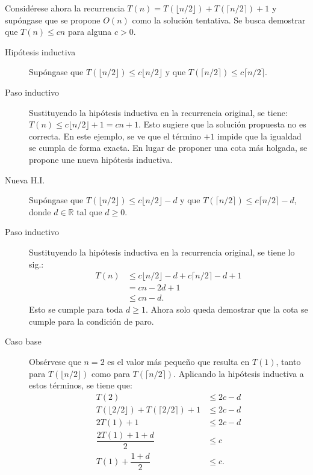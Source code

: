 \newpage
\begin{expl}
    Considérese ahora la recurrencia \(T(n)=T(\lfloor n/2\rfloor)+T(\lceil n/2\rceil)+1\) y supóngase que se propone \(O(n)\) como la solución tentativa. 
    Se busca demostrar que \(T(n)\leq cn\) para alguna \(c>0\).
    \begin{description}
      \item[Hipótesis inductiva] Supóngase que \(T(\lfloor n/2\rfloor)\leq c\lfloor n/2\rfloor\) y que \(T(\lceil n/2\rceil)\leq c\lceil n/2\rceil\).
      \item[Paso inductivo] Sustituyendo la hipótesis inductiva en la recurrencia original, se tiene: \(T(n) \leq c\lfloor n/2 \rfloor + 1 = cn + 1\).
      Esto sugiere que la solución propuesta no es correcta.
      En este ejemplo, se ve que el término \(+1\) impide que la igualdad se cumpla de forma exacta.
      En lugar de proponer una cota más holgada, se propone une nueva hipótesis inductiva.
      \item[Nueva H.I.] Supóngase que \(T(\lfloor n/2\rfloor)\leq c\lfloor n/2\rfloor-d\) y que \(T(\lceil n/2\rceil)\leq c\lceil n/2\rceil-d\), donde \(d\in\mathbb{R}\) tal que \(d\geq 0\).
      \item[Paso inductivo] Sustituyendo la hipótesis inductiva en la recurrencia original, se tiene lo sig.:
      \begin{align*}
        T(n) &\leq c\lfloor n/2\rfloor-d+c\lceil n/2\rceil-d+1\\
        &=cn-2d+1\\
        &\leq cn-d.
      \end{align*}
      Esto se cumple para toda \(d\geq 1\). 
      Ahora solo queda demostrar que la cota se cumple para la condición de paro.
      \item[Caso base] Obsérvese que \(n=2\) es el valor más pequeño que resulta en \(T(1)\), tanto para \(T(\lfloor n/2 \rfloor)\) como para \(T(\lceil n/2 \rceil)\). 
      Aplicando la hipótesis inductiva a estos términos, se tiene que:
      \begin{align*}
        T(2) &\leq 2c-d\\
        T(\lfloor 2/2 \rfloor) + T(\lceil 2/2 \rceil) + 1 &\leq 2c-d \\
        2T(1) + 1 &\leq 2c - d \\
        \dfrac{2T(1)+1+d}{2} &\leq c \\
        T(1) + \dfrac{1+d}{2} &\leq c.
      \end{align*}
      \exend
    \end{description}
\end{expl}


